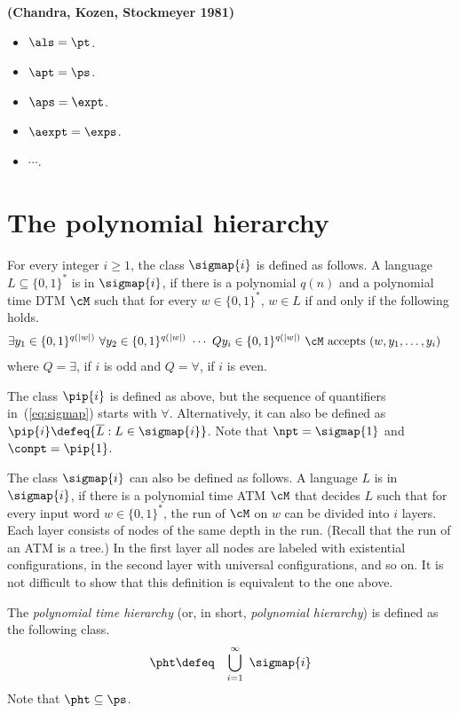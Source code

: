\documentclass[11pt, a4paper]{article}
\begin{document}
\begin{theorem}
\label{theo:alternation}
{\bf (Chandra, Kozen, Stockmeyer 1981)}
\begin{itemize}
\item 
$\als=\pt$.
\item
$\apt=\ps$.
\item
$\aps=\expt$.
\item
$\aexpt=\exps$.
\item
$\cdots$.
\end{itemize}
\end{theorem}


\section{The polynomial hierarchy}

For every integer $i\geq 1$, the class $\sigmap {i}$ is defined as follows.
A language $L \subseteq \{0,1\}^*$ is in $\sigmap {i}$,
if there is a polynomial $q(n)$ and a polynomial time DTM $\cM$
such that for every $w\in \{0,1\}^*$,
$w\in L$ if and only if the following holds.
\begin{eqnarray}
\label{eq:sigmap}
& 
\exists y_1 \in \{0,1\}^{q(|w|)}\ 
\forall y_2 \in \{0,1\}^{q(|w|)}\
\cdots \
Q y_i \in \{0,1\}^{q(|w|)}\
\cM \ \text{accepts}\ (w,y_1,\ldots,y_i) 
&
\end{eqnarray}
where $Q = \exists$, if $i$ is odd and $Q=\forall$, if $i$ is even.


The class $\pip {i}$ is defined as above, but the sequence of quantifiers in~(\ref{eq:sigmap}) starts with $\forall$.
Alternatively, it can also be defined as
$\pip {i} \defeq \{\overline{L} : L \in \sigmap {i}\}$.
Note that $\npt = \sigmap {1}$ and $\conpt = \pip {1}$.

\begin{remark}
The class $\sigmap {i}$ can also be defined as follows.
A language $L$ is in $\sigmap {i}$, if there is a polynomial time ATM $\cM$ that decides $L$ such that
for every input word $w\in \{0,1\}^*$,
the run of $\cM$ on $w$ can be divided into $i$ layers.
Each layer consists of nodes of the same depth in the run.
(Recall that the run of an ATM is a tree.)
In the first layer all nodes are labeled with existential configurations,
in the second layer with universal configurations, and so on.
It is not difficult to show that this definition is equivalent to the one above.
\end{remark}

The {\em polynomial time hierarchy} (or, in short, {\em polynomial hierarchy}) is defined as the following class.
\begin{eqnarray*}
\pht & \defeq & \bigcup_{i=1}^{\infty} \ \sigmap {i}
\end{eqnarray*}
Note that $\pht \subseteq \ps$.
\end{document}
